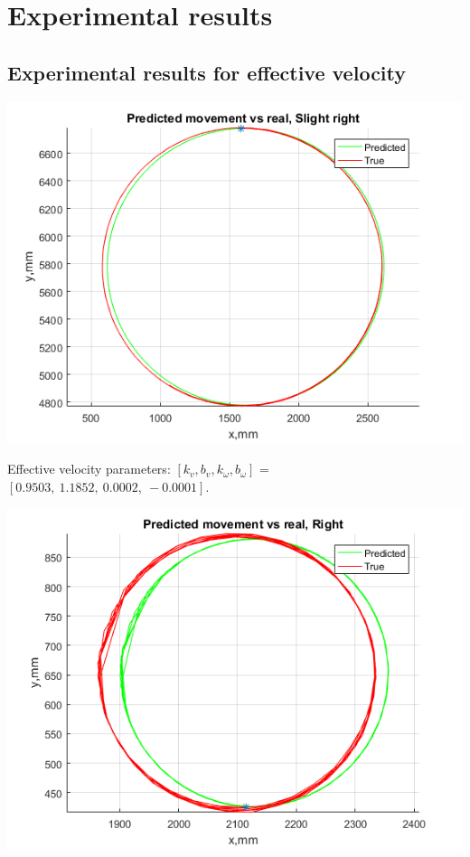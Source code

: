 \documentclass[a4paper, 12pt]{article}
\begin{document}
\section{Experimental results}

\subsection{Experimental results for effective velocity}


\includegraphics[scale = 0.8]{re.png}

Effective velocity parameters: $[k_v, b_v, k_{\omega}, b_{\omega}]$ = $[0.9503,~    1.1852,~    0.0002,~   -0.0001]$.

\includegraphics[scale = 0.8]{rre.png}
\end{document}
